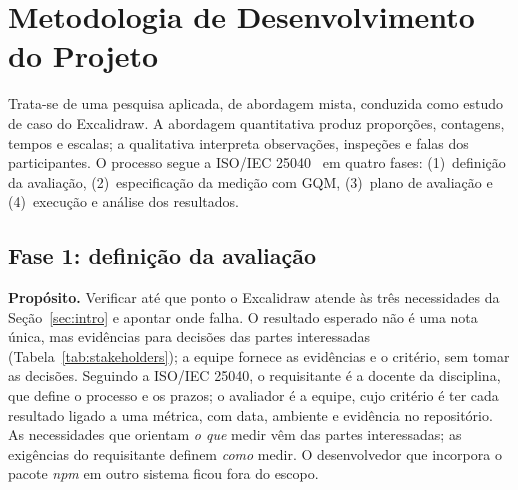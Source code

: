 \documentclass[conference]{IEEEtran}
\begin{document}
\section{Metodologia de Desenvolvimento do Projeto}
\label{sec:met}

Trata-se de uma pesquisa aplicada, de abordagem mista, conduzida como estudo
de caso do Excalidraw. A abordagem quantitativa produz proporções,
contagens, tempos e escalas; a qualitativa interpreta observações, inspeções
e falas dos participantes. O processo segue a ISO/IEC 25040~\cite{iso25040}
em quatro fases: (1)~definição da avaliação, (2)~especificação da medição com
GQM, (3)~plano de avaliação e (4)~execução e análise dos resultados.

\subsection{Fase 1: definição da avaliação}
\label{sec:fase1}

\textbf{Propósito.} Verificar até que ponto o Excalidraw atende às três
necessidades da Seção~\ref{sec:intro} e apontar onde falha. O resultado
esperado não é uma nota única, mas evidências para decisões das partes
interessadas (Tabela~\ref{tab:stakeholders}); a equipe fornece as evidências
e o critério, sem tomar as decisões. Seguindo a ISO/IEC 25040, o requisitante
é a docente da disciplina, que define o processo e os prazos; o avaliador é a
equipe, cujo critério é ter cada resultado ligado a uma métrica, com data,
ambiente e evidência no repositório. As necessidades que orientam
\textit{o que} medir vêm das partes interessadas; as exigências do
requisitante definem \textit{como} medir. O desenvolvedor que incorpora o
pacote \textit{npm} em outro sistema ficou fora do escopo.
\end{document}
